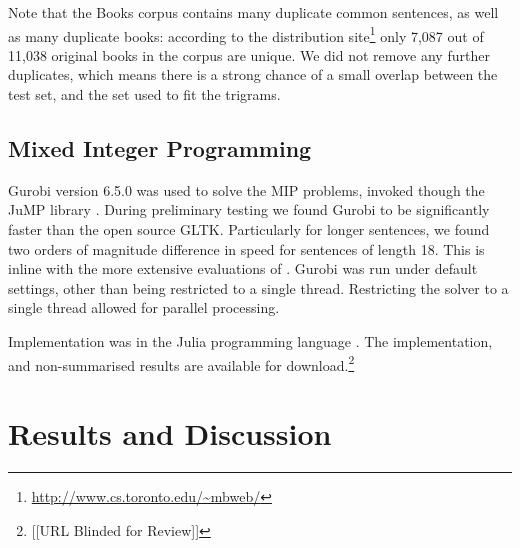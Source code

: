 \documentclass[11pt]{article}
\theoremstyle{plain}
\theoremstyle{definition}
\newcommand{\parencite}{\protect\cite}
\newcommand{\textcite}{\protect\newcite}
\begin{document}
Note that the Books corpus contains many duplicate common sentences, as well as many duplicate books: according to the distribution site\footnote{\url{http://www.cs.toronto.edu/~mbweb/}} only 7,087 out of 11,038 original books in the corpus are unique. We did not remove any further duplicates, which means there is a strong chance of a small overlap between the test set, and the set used to fit the trigrams.
 

\subsection{Mixed Integer Programming}
Gurobi version 6.5.0 was used to solve the MIP problems, invoked though the JuMP library \parencite{jump}. During preliminary testing we found Gurobi to be significantly faster than the open source GLTK. Particularly for longer sentences, we found two orders of magnitude difference in speed for sentences of length 18. This is inline with the more extensive evaluations of \textcite{meindl2012analysis}. Gurobi was run under default settings, other than being restricted to a single thread. Restricting the solver to a single thread allowed for parallel processing.

Implementation was in the Julia programming language \parencite{Julia}. The implementation, and non-summarised results are available for download.\footnote{[[URL Blinded for Review]]}



\section{Results and Discussion} \label{results}
\end{document}
